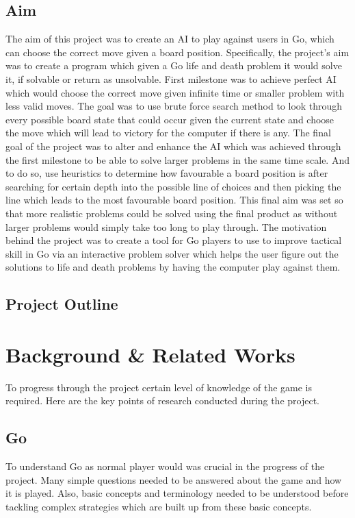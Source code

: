 \documentclass{l4proj}
\begin{document}
\section{Aim}

The aim of this project was to create an AI to play against users in Go, which can choose the correct move given a board position. Specifically, the project’s aim was to create a program which given a Go life and death problem it would solve it, if solvable or return as unsolvable. First milestone was to achieve perfect AI which would choose the correct move given infinite time or smaller problem with less valid moves. The goal was to use brute force search method to look through every possible board state that could occur given the current state and choose the move which will lead to victory for the computer if there is any. The final goal of the project was to alter and enhance the AI which was achieved through the first milestone to be able to solve larger problems in the same time scale. And to do so, use heuristics to determine how favourable a board position is after searching for certain depth into the possible line of choices and then picking the line which leads to the most favourable board position. This final aim was set so that more realistic problems could be solved using the final product as without larger problems would simply take too long to play through. The motivation behind the project was to create a tool for Go players to use to improve tactical skill in Go via an interactive problem solver which helps the user figure out the solutions to life and death problems by having the computer play against them.

\section{Project Outline}








\chapter{Background \& Related Works}
To progress through the project certain level of knowledge of the game is required. Here are the key points of research conducted during the project.

\section{Go}
To understand Go as normal player would was crucial in the progress of the project. Many simple questions needed to be answered about the game and how it is played. Also, basic concepts and terminology needed to be understood before tackling complex strategies which are built up from these basic concepts.
\end{document}
